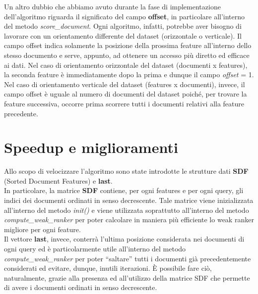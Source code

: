 Un altro dubbio che abbiamo avuto durante la fase di implementazione dell'algoritmo riguarda il significato del campo \textbf{offset}, in particolare all'interno del metodo \textit{score\_document}. Ogni algoritmo, infatti, potrebbe aver bisogno di lavorare con un orientamento differente del dataset (orizzontale o verticale). Il campo offset indica solamente la posizione della prossima feature all'interno dello stesso documento e serve, appunto, ad ottenere un accesso più diretto ed efficace ai dati. Nel caso di orientamento orizzontale del dataset (documenti x features), la seconda feature è immediatamente dopo la prima e dunque il campo \textit{offset} = 1. Nel caso di orientamento verticale del dataset (features x documenti), invece, il campo offset è uguale al numero di documenti del dataset poiché, per trovare la feature successiva, occorre prima scorrere tutti i documenti relativi alla feature precedente.\\

	\section*{Speedup e miglioramenti}
Allo scopo di velocizzare l'algoritmo sono state introdotte le strutture dati \textbf{SDF} (Sorted Document Features) e \textbf{last}.\\
In particolare, la matrice \textbf{SDF} contiene, per ogni features e per ogni query, gli indici dei documenti ordinati in senso decrescente. Tale matrice viene inizializzata all'interno del metodo \textit{init()} e viene utilizzata soprattutto all'interno del metodo \textit{compute\_weak\_ranker} per poter calcolare in maniera più efficiente lo weak ranker migliore per ogni feature.\\
Il vettore \textbf{last}, invece, conterrà l'ultima posizione considerata nei documenti di ogni query ed è particolarmente utile all'interno del metodo \textit{compute\_weak\_ranker} per poter ``saltare'' tutti i documenti già precedentemente considerati ed evitare, dunque, inutili iterazioni. È possibile fare ciò, naturalmente, grazie alla presenza ed all'utilizzo della matrice SDF che permette di avere i documenti ordinati in senso decrescente.
